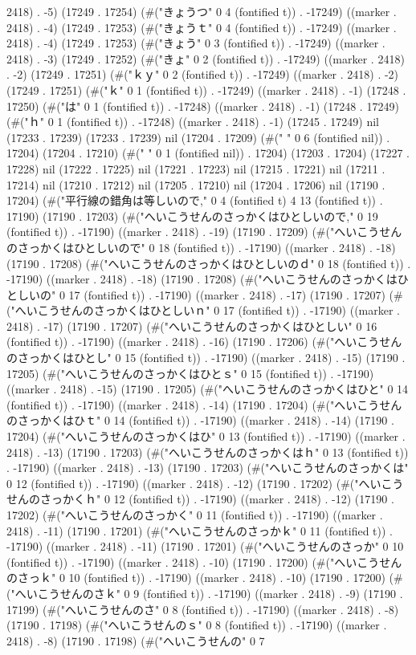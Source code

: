 2418) . -5) (17249 . 17254) (#("きょうつ" 0 4 (fontified t)) . -17249) ((marker . 2418) . -4) (17249 . 17253) (#("きょうｔ" 0 4 (fontified t)) . -17249) ((marker . 2418) . -4) (17249 . 17253) (#("きょう" 0 3 (fontified t)) . -17249) ((marker . 2418) . -3) (17249 . 17252) (#("きょ" 0 2 (fontified t)) . -17249) ((marker . 2418) . -2) (17249 . 17251) (#("ｋｙ" 0 2 (fontified t)) . -17249) ((marker . 2418) . -2) (17249 . 17251) (#("ｋ" 0 1 (fontified t)) . -17249) ((marker . 2418) . -1) (17248 . 17250) (#("は" 0 1 (fontified t)) . -17248) ((marker . 2418) . -1) (17248 . 17249) (#("ｈ" 0 1 (fontified t)) . -17248) ((marker . 2418) . -1) (17245 . 17249) nil (17233 . 17239) (17233 . 17239) nil (17204 . 17209) (#("		    " 0 6 (fontified nil)) . 17204) (17204 . 17210) (#(" " 0 1 (fontified nil)) . 17204) (17203 . 17204) (17227 . 17228) nil (17222 . 17225) nil (17221 . 17223) nil (17215 . 17221) nil (17211 . 17214) nil (17210 . 17212) nil (17205 . 17210) nil (17204 . 17206) nil (17190 . 17204) (#("平行線の錯角は等しいので," 0 4 (fontified t) 4 13 (fontified t)) . 17190) (17190 . 17203) (#("へいこうせんのさっかくはひとしいので," 0 19 (fontified t)) . -17190) ((marker . 2418) . -19) (17190 . 17209) (#("へいこうせんのさっかくはひとしいので" 0 18 (fontified t)) . -17190) ((marker . 2418) . -18) (17190 . 17208) (#("へいこうせんのさっかくはひとしいのｄ" 0 18 (fontified t)) . -17190) ((marker . 2418) . -18) (17190 . 17208) (#("へいこうせんのさっかくはひとしいの" 0 17 (fontified t)) . -17190) ((marker . 2418) . -17) (17190 . 17207) (#("へいこうせんのさっかくはひとしいｎ" 0 17 (fontified t)) . -17190) ((marker . 2418) . -17) (17190 . 17207) (#("へいこうせんのさっかくはひとしい" 0 16 (fontified t)) . -17190) ((marker . 2418) . -16) (17190 . 17206) (#("へいこうせんのさっかくはひとし" 0 15 (fontified t)) . -17190) ((marker . 2418) . -15) (17190 . 17205) (#("へいこうせんのさっかくはひとｓ" 0 15 (fontified t)) . -17190) ((marker . 2418) . -15) (17190 . 17205) (#("へいこうせんのさっかくはひと" 0 14 (fontified t)) . -17190) ((marker . 2418) . -14) (17190 . 17204) (#("へいこうせんのさっかくはひｔ" 0 14 (fontified t)) . -17190) ((marker . 2418) . -14) (17190 . 17204) (#("へいこうせんのさっかくはひ" 0 13 (fontified t)) . -17190) ((marker . 2418) . -13) (17190 . 17203) (#("へいこうせんのさっかくはｈ" 0 13 (fontified t)) . -17190) ((marker . 2418) . -13) (17190 . 17203) (#("へいこうせんのさっかくは" 0 12 (fontified t)) . -17190) ((marker . 2418) . -12) (17190 . 17202) (#("へいこうせんのさっかくｈ" 0 12 (fontified t)) . -17190) ((marker . 2418) . -12) (17190 . 17202) (#("へいこうせんのさっかく" 0 11 (fontified t)) . -17190) ((marker . 2418) . -11) (17190 . 17201) (#("へいこうせんのさっかｋ" 0 11 (fontified t)) . -17190) ((marker . 2418) . -11) (17190 . 17201) (#("へいこうせんのさっか" 0 10 (fontified t)) . -17190) ((marker . 2418) . -10) (17190 . 17200) (#("へいこうせんのさっｋ" 0 10 (fontified t)) . -17190) ((marker . 2418) . -10) (17190 . 17200) (#("へいこうせんのさｋ" 0 9 (fontified t)) . -17190) ((marker . 2418) . -9) (17190 . 17199) (#("へいこうせんのさ" 0 8 (fontified t)) . -17190) ((marker . 2418) . -8) (17190 . 17198) (#("へいこうせんのｓ" 0 8 (fontified t)) . -17190) ((marker . 2418) . -8) (17190 . 17198) (#("へいこうせんの" 0 7 